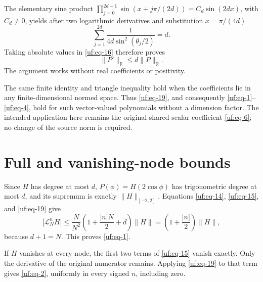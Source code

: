 The elementary sine product
\(\prod_{j=0}^{2d-1}\sin(x+j\pi/(2d))=C_d\sin(2dx)\), with \(C_d\ne0\),
yields after two logarithmic derivatives and substitution \(x=\pi/(4d)\)
\begin{equation}\label{uf:eq-18}
\sum_{j=1}^{2d}\frac1{4d\sin^2(\theta_j/2)}=d.
\end{equation} Taking absolute values in \eqref{uf:eq-16} therefore proves \begin{equation}\label{uf:eq-19}
\|P'\|_{\mathbb R}\le d\|P\|_{\mathbb R}.
\end{equation} The argument works without real coefficients or positivity.

The same finite identity and triangle inequality hold when the
coefficients lie in any finite-dimensional normed space. Thus \eqref{uf:eq-19}, and
consequently \eqref{uf:eq-1}--\eqref{uf:eq-4}, hold for such vector-valued polynomials without a
dimension factor. The intended application here remains the original
shared scalar coefficient \eqref{uf:eq-6}; no change of the source norm is required.

\section{Full and vanishing-node
bounds}\label{uf:sec-full-and-vanishing-node-bounds}

Since \(H\) has degree at most \(d\), \(P(\phi)=H(2\cos\phi)\) has
trigonometric degree at most \(d\), and its supremum is exactly
\(\|H\|_{[-2,2]}\). Equations \eqref{uf:eq-14}, \eqref{uf:eq-15}, and \eqref{uf:eq-19} give \begin{equation}\label{uf:eq-20}
|\mathcal L_N^{n}H|
 \le\frac{N}{N^2}\left(1+\frac{|n|N}{2}+d\right)\|H\|
 =\left(1+\frac{|n|}{2}\right)\|H\|,
\end{equation} because \(d+1=N\). This proves \eqref{uf:eq-1}.

If \(H\) vanishes at every node, the first two terms of \eqref{uf:eq-15} vanish
exactly. Only the derivative of the original numerator remains. Applying
\eqref{uf:eq-19} to that term gives \eqref{uf:eq-2}, uniformly in every signed \(n\), including
zero.

